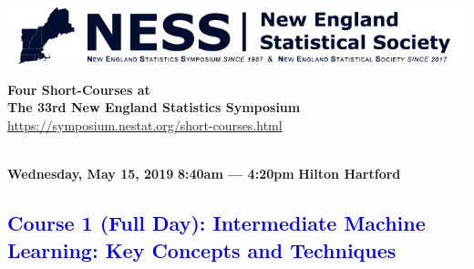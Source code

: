 \documentclass[11pt]{article}
\newcommand{\blue}[1]{{\textcolor{blue}{#1}}}
\begin{document}
\begin{center}
\begin{minipage}[m]{3.5in}
\includegraphics[width=\linewidth]{ness-banner.png}
\end{minipage}
\hspace{0.2cm}
\begin{minipage}[m]{4in}
\begin{center}
{\bf\large Four Short-Courses at \\
  The 33rd New England Statistics Symposium}
\url{https://symposium.nestat.org/short-courses.html}
\end{center}
\end{minipage}
\\[2ex]
{\bf Wednesday, May 15, 2019} \hfill
{\bf 8:40am --- 4:20pm} \hfill
{\bf Hilton Hartford}
\end{center}


\blue{
\subsection*{Course 1 (Full Day):  Intermediate Machine Learning: Key
  Concepts and Techniques}
}
\end{document}
